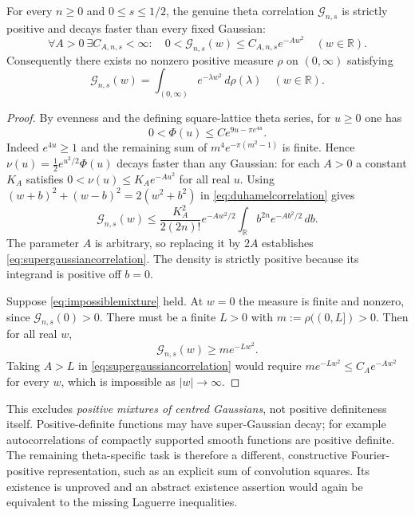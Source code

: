 \begin{theorem}
\label{thm:nogaussianmixture}
For every $n\ge0$ and
$0\le s\le1/2$, the genuine theta
correlation $\mathcal G_{n,s}$ is
strictly positive and decays faster
than every fixed Gaussian:
\begin{equation}
\forall A>0\ \exists C_{A,n,s}<\infty:
\quad
0<\mathcal G_{n,s}(w)
\le C_{A,n,s}e^{-Aw^2}
\quad(w\in\mathbb R).
\label{eq:supergaussiancorrelation}
\end{equation}
Consequently there exists no
nonzero positive measure $\rho$
on $(0,\infty)$ satisfying
\begin{equation}
\mathcal G_{n,s}(w)=
\int_{(0,\infty)}e^{-\lambda w^2}
\,d\rho(\lambda)
\quad(w\in\mathbb R).
\label{eq:impossiblemixture}
\end{equation}
\end{theorem}
\begin{proof}
By evenness and the defining
square-lattice theta series, for
$u\ge0$ one has
\[
0<\Phi(u)\le
C e^{9u-\pi e^{4u}}.
\]
Indeed $e^{4u}\ge1$ and the
remaining sum of
$m^4e^{-\pi(m^2-1)}$
is finite. Hence
$\nu(u)=\frac12e^{u^2/2}\Phi(u)$
decays faster than any Gaussian:
for each $A>0$ a constant $K_A$
satisfies
$0<\nu(u)\le K_Ae^{-Au^2}$
for all real $u$.
Using $(w+b)^2+(w-b)^2
=2(w^2+b^2)$ in
\eqref{eq:duhamelcorrelation} gives
\[
\mathcal G_{n,s}(w)
\le\frac{K_A^2}{2(2n)!}
e^{-Aw^2/2}
\int_{\mathbb R}
b^{2n}e^{-Ab^2/2}\,db.
\]
The parameter $A$ is arbitrary,
so replacing it by $2A$
establishes \eqref{eq:supergaussiancorrelation}.
The density is strictly positive
because its integrand is positive
off $b=0$.

Suppose \eqref{eq:impossiblemixture}
held. At $w=0$ the measure is
finite and nonzero, since
$\mathcal G_{n,s}(0)>0$.
There must be a finite $L>0$
with $m:=\rho((0,L])>0$.
Then for all real $w$,
\[
\mathcal G_{n,s}(w)
\ge m e^{-Lw^2}.
\]
Taking $A>L$ in
\eqref{eq:supergaussiancorrelation}
would require
$m e^{-Lw^2}\le
C_Ae^{-Aw^2}$ for every $w$,
which is impossible as
$|w|\to\infty$.
\end{proof}

This excludes \emph{positive mixtures
of centred Gaussians}, not positive
definiteness itself. Positive-definite
functions may have super-Gaussian
decay; for example autocorrelations
of compactly supported smooth
functions are positive definite.
The remaining theta-specific
task is therefore a different,
constructive Fourier-positive
representation, such as an explicit
sum of convolution squares.
Its existence is unproved
and an abstract existence assertion
would again be equivalent to
the missing Laguerre inequalities.

